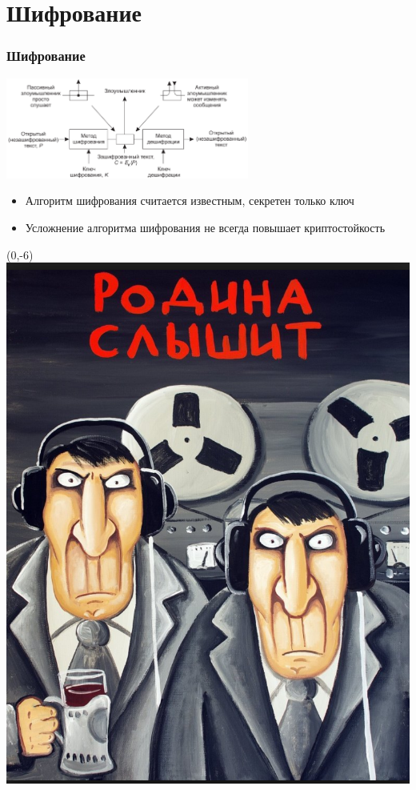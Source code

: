 \documentclass{../cscslides}
\begin{document}
    \section{Шифрование}

    \begin{frame}
        \frametitle{Шифрование}
        \begin{center}
            \includegraphics[width=0.6\textwidth]{cryptography.png}
        \end{center}
        \begin{itemize}
            \item Алгоритм шифрования считается известным, секретен только ключ
            \item Усложнение алгоритма шифрования не всегда повышает криптостойкость
        \end{itemize}
        \begin{textblock}{2}(0,-6)
            \includegraphics[width=\textwidth]{youAreBeingWatched.png}
        \end{textblock}
    \end{frame}
\end{document}
